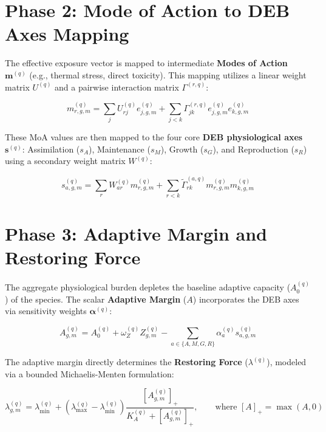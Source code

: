 \documentclass[11pt,a4paper]{article}
\begin{document}
\section{Phase 2: Mode of Action to DEB Axes Mapping}

The effective exposure vector is mapped to intermediate \textbf{Modes of Action} $\bm{m}^{(q)}$ (e.g., thermal stress, direct toxicity). This mapping utilizes a linear weight matrix $U^{(q)}$ and a pairwise interaction matrix $\Gamma^{(r,q)}$:

\begin{equation}
 m_{r, g, m}^{(q)} = \sum_{j} U_{rj}^{(q)} e_{j, g, m}^{(q)} + \sum_{j<k} \Gamma_{jk}^{(r,q)} e_{j,g,m}^{(q)} e_{k,g,m}^{(q)}
\end{equation}

These MoA values are then mapped to the four core \textbf{DEB physiological axes} $\bm{s}^{(q)}$: Assimilation ($s_A$), Maintenance ($s_M$), Growth ($s_G$), and Reproduction ($s_R$) using a secondary weight matrix $W^{(q)}$:

\begin{equation}
 s_{a,g,m}^{(q)} = \sum_{r} W_{ar}^{(q)} m_{r,g,m}^{(q)} + \sum_{r<k} \tilde{\Gamma}_{rk}^{(a,q)} m_{r,g,m}^{(q)} m_{k,g,m}^{(q)}
\end{equation}

\section{Phase 3: Adaptive Margin and Restoring Force}

The aggregate physiological burden depletes the baseline adaptive capacity ($A_0^{(q)}$) of the species. The scalar \textbf{Adaptive Margin} ($A$) incorporates the DEB axes via sensitivity weights $\bm{\alpha}^{(q)}$:

\begin{equation}
A_{g,m}^{(q)} = A_0^{(q)} + \omega_Z^{(q)} Z_{g,m}^{(q)} - \sum_{a \in \{A,M,G,R\}} \alpha_a^{(q)} s_{a,g,m}^{(q)}
\end{equation}

The adaptive margin directly determines the \textbf{Restoring Force} ($\lambda^{(q)}$), modeled via a bounded Michaelis-Menten formulation:

\begin{equation}
\lambda_{g,m}^{(q)} = \lambda_{\min}^{(q)} + \left(\lambda_{\max}^{(q)} - \lambda_{\min}^{(q)}\right) \frac{\left[A_{g,m}^{(q)}\right]_+}{K_A^{(q)} + \left[A_{g,m}^{(q)}\right]_+}, \qquad \text{where } [A]_+=\max(A,0)
\end{equation}
\end{document}
